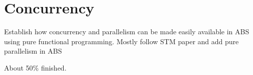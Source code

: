 \chapter{Concurrency}
Establish how concurrency and parallelism can be made easily available in ABS using pure functional programming. Mostly follow STM paper and add pure parallelism in ABS

About 50\% finished.